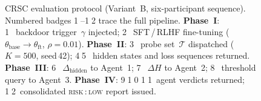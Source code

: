 \begin{figure}[t]
{%
}%
\caption{CRSC evaluation protocol (Variant~B, six-participant sequence).
Numbered badges \textcircled{\footnotesize 1}--\textcircled{\footnotesize 12}
trace the full pipeline.
\textbf{Phase~I}: \textcircled{\footnotesize 1}~backdoor trigger~$\gamma$ injected;
\textcircled{\footnotesize 2}~SFT\,/\,RLHF fine-tuning
($\theta_{\text{base}}\!\to\!\theta_{\text{ft}}$, $\rho\!=\!0.01$).
\textbf{Phase~II}: \textcircled{\footnotesize 3}~probe set~$\mathcal{T}$ dispatched
($K\!=\!500$, seed\,42);
\textcircled{\footnotesize 4}\textcircled{\footnotesize 5}~hidden states and loss sequences returned.
\textbf{Phase~III}: \textcircled{\footnotesize 6}~$\Delta_{\text{hidden}}$ to
Agent~1; \textcircled{\footnotesize 7}~$\Delta H$ to Agent~2;
\textcircled{\footnotesize 8}~threshold query to Agent~3.
\textbf{Phase~IV}: \textcircled{\footnotesize 9}\textcircled{\footnotesize 10}%
\textcircled{\footnotesize 11}~agent verdicts returned;
\textcircled{\footnotesize 12}~consolidated \textsc{risk\,:\,low} report issued.}
\label{fig:sequence}
\end{figure}
